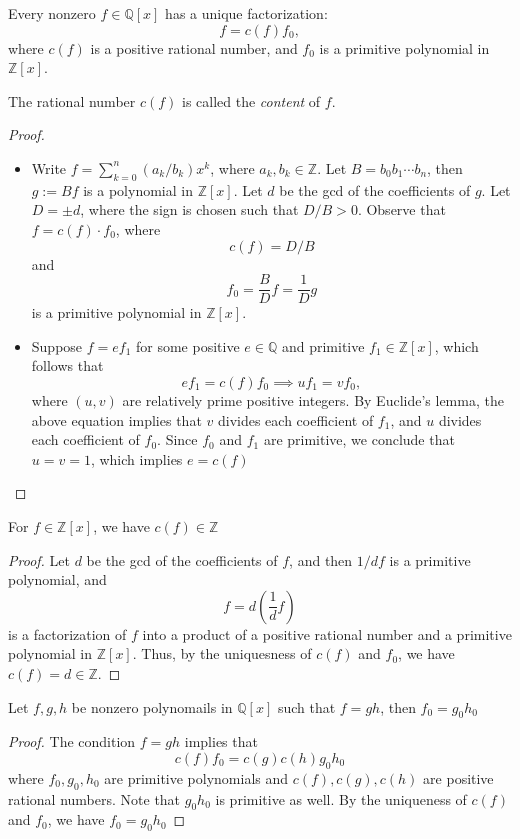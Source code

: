 \begin{proposition}
Every nonzero $f\in\mathbb{Q}[x]$ has a unique factorization:
\[
f=c(f)f_0,
\]
where $c(f)$ is a positive rational number, and $f_0$ is a primitive polynomial in $\mathbb{Z}[x]$.
\end{proposition}
\begin{definition}
The rational number $c(f)$ is called the \emph{content} of $f$.
\end{definition}
\begin{proof}
\begin{itemize}
\item
Write $f=\sum_{k=0}^n(a_k/b_k)x^k$, where $a_k,b_k\in\mathbb{Z}$. Let $B=b_0b_1\cdots b_n$, then $g:=Bf$ is a polynomial in $\mathbb{Z}[x]$. Let $d$ be the gcd of the coefficients of $g$. Let $D=\pm d$, where the sign is chosen such that $D/B>0$. Observe that $f=c(f)\cdot f_0$, where 
\[
c(f)=D/B
\]
and
\[
f_0=\frac{B}{D}f=\frac{1}{D}g
\]
is a primitive polynomial in $\mathbb{Z}[x]$.
\item
Suppose $f=ef_1$ for some positive $e\in\mathbb{Q}$ and primitive $f_1\in\mathbb{Z}[x]$, which follows that
\[
ef_1=c(f)f_0\implies uf_1=vf_0,
\]
where $(u,v)$ are relatively prime positive integers. By Euclide's lemma, the above equation implies that $v$ divides each coefficient of $f_1$, and $u$ divides each coefficient of $f_0$. Since $f_0$ and $f_1$ are primitive, we conclude that $u=v=1$, which implies $e=c(f)$
\end{itemize}
\end{proof}
\begin{corollary}
For $f\in\mathbb{Z}[x]$, we have $c(f)\in\mathbb{Z}$
\end{corollary}
\begin{proof}
Let $d$ be the gcd of the coefficients of $f$, and then $1/df$ is a primitive polynomial, and 
\[
f=d\left(\frac{1}{d}f\right)
\]
is a factorization of $f$ into a product of a positive rational number and a primitive polynomial in $\mathbb{Z}[x]$. Thus, by the uniquesness of $c(f)$ and $f_0$, we have $c(f)=d\in\mathbb{Z}$.
\end{proof}
\begin{corollary}
Let $f,g,h$ be nonzero polynomails in $\mathbb{Q}[x]$ such that $f=gh$, then $f_0=g_0h_0$
\end{corollary}
\begin{proof}
The condition $f=gh$ implies that
\[
c(f)f_0=c(g)c(h)g_0h_0
\]
where $f_0,g_0,h_0$ are primitive polynomials and $c(f),c(g),c(h)$ are positive rational numbers. Note that $g_0h_0$ is primitive as well. By the uniqueness of $c(f)$ and $f_0$, we have $f_0=g_0h_0$
\end{proof}
